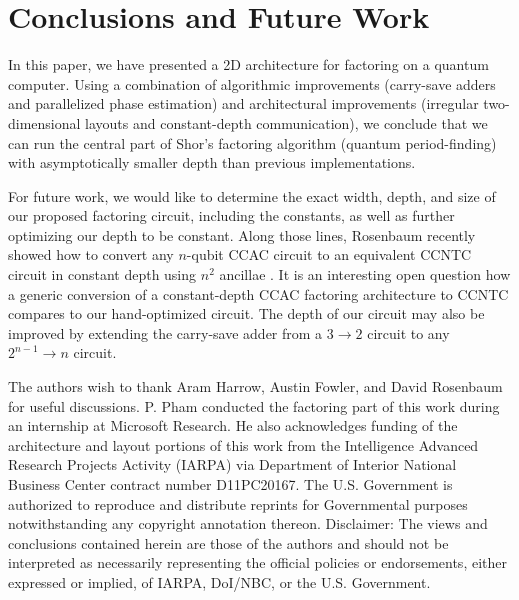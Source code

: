 \documentclass[twoside]{article}
\begin{document}
%
\section{Conclusions and Future Work}
\label{sec:conclude}

In this paper, we have presented a 2D architecture for factoring on a quantum
computer.
Using a combination of algorithmic
improvements (carry-save adders and parallelized phase estimation)
and architectural improvements (irregular two-dimensional layouts and
constant-depth communication), we conclude
that we can run
the central part of Shor's factoring algorithm (quantum period-finding)
with asymptotically smaller depth than previous implementations.


For future work, we would like to determine the exact width, depth, and size of
our proposed factoring circuit, including the constants, as well as
further optimizing our depth to be constant.
Along those lines, Rosenbaum recently showed how to convert any $n$-qubit CCAC
circuit to an equivalent CCNTC circuit in constant depth using $n^2$ ancillae
\cite{Rosenbaum2012}.
It is an interesting open question how a
generic conversion of a constant-depth CCAC factoring architecture
\cite{Browne2009,Hoyer2002} to CCNTC compares to our hand-optimized circuit.
The depth of our circuit may also be improved by extending the carry-save adder
from
a $3\rightarrow 2$ circuit to any $2^{n-1}\rightarrow n$ circuit.

\noindent
The authors wish to thank Aram Harrow, Austin Fowler, and David Rosenbaum for
useful discussions.
P. Pham conducted the factoring part of this work during
an internship at Microsoft Research.
He also acknowledges funding of the architecture and layout portions
of this work from
the Intelligence Advanced Research Projects Activity
(IARPA) via Department of Interior National Business Center contract
number D11PC20167. The U.S. Government is authorized to reproduce and
distribute reprints for Governmental purposes notwithstanding any
copyright annotation thereon. Disclaimer: The views and conclusions
contained herein are those of the authors and should not be
interpreted as necessarily representing the official policies or
endorsements, either expressed or implied, of IARPA, DoI/NBC, or the
U.S. Government.

\noindent




\end{document}
